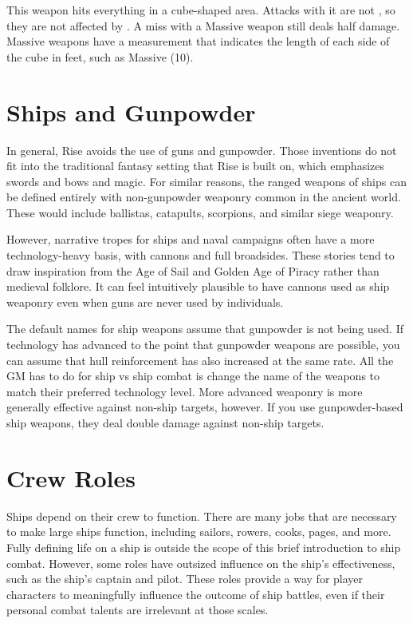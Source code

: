      This weapon hits everything in a cube-shaped area.
    Attacks with it are not , so they are not affected by .
    A miss with a Massive weapon still deals half damage.
    Massive weapons have a measurement that indicates the length of each side of the cube in feet, such as Massive (10).

\section{Ships and Gunpowder}
  In general, Rise avoids the use of guns and gunpowder.
  Those inventions do not fit into the traditional fantasy setting that Rise is built on, which emphasizes swords and bows and magic.
  For similar reasons, the ranged weapons of ships can be defined entirely with non-gunpowder weaponry common in the ancient world.
  These would include ballistas, catapults, scorpions, and similar siege weaponry.

  However, narrative tropes for ships and naval campaigns often have a more technology-heavy basis, with cannons and full broadsides.
  These stories tend to draw inspiration from the Age of Sail and Golden Age of Piracy rather than medieval folklore.
  It can feel intuitively plausible to have cannons used as ship weaponry even when guns are never used by individuals.

  The default names for ship weapons assume that gunpowder is not being used.
  If technology has advanced to the point that gunpowder weapons are possible, you can assume that hull reinforcement has also increased at the same rate.
  All the GM has to do for ship vs ship combat is change the name of the weapons to match their preferred technology level.
  More advanced weaponry is more generally effective against non-ship targets, however.
  If you use gunpowder-based ship weapons, they deal double damage against non-ship targets.

\section{Crew Roles}\label{Crew Roles}
  Ships depend on their crew to function.
  There are many jobs that are necessary to make large ships function, including sailors, rowers, cooks, pages, and more.
  Fully defining life on a ship is outside the scope of this brief introduction to ship combat.
  However, some roles have outsized influence on the ship's effectiveness, such as the ship's captain and pilot.
  These roles provide a way for player characters to meaningfully influence the outcome of ship battles, even if their personal combat talents are irrelevant at those scales.

